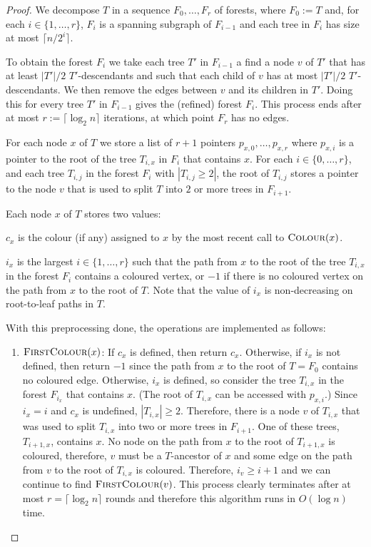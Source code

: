 \documentclass[kpfonts]{patmorin}
\let\ge\geqslant
\begin{document}
 \begin{proof}
     We decompose $T$ in a sequence $F_0,\ldots,F_r$ of forests, where $F_0:=T$ and, for each $i\in\{1,\ldots,r\}$, $F_i$ is a spanning subgraph of $F_{i-1}$ and each tree in $F_i$ has size at most $\lceil n/2^i\rceil$.

     To obtain the forest $F_i$ we take each tree $T'$ in $F_{i-1}$
     a find a node $v$ of $T'$ that has at least $|T'|/2$ $T'$-descendants and such that each child of $v$ has at most $|T'|/2$ $T'$-descendants.  We then remove the edges between $v$ and its children in $T'$.  Doing this for every tree $T'$ in $F_{i-1}$ gives the (refined) forest $F_i$.  This process ends after at most $r:=\lceil\log_2 n\rceil$ iterations, at which point $F_r$ has no edges.

     For each node $x$ of $T$ we store a list of $r+1$ pointers $p_{x,0},\ldots,p_{x,r}$ where $p_{x,i}$ is a pointer to the root of the tree $T_{i,x}$ in $F_i$ that contains $x$.  For each $i\in\{0,\ldots,r\}$, and each tree $T_{i,j}$ in the forest $F_i$ with $|T_{i,j}\ge 2|$, the root of $T_{i,j}$ stores a pointer to the node $v$ that is used to split $T$ into $2$ or more trees in $F_{i+1}$.

     Each node $x$ of $T$ stores two values:
     \begin{compactenum}
       \item $c_x$ is the colour (if any) assigned to $x$ by the most recent call to $\textsc{Colour}(x)$.
       \item $i_x$ is the largest $i\in\{1,\ldots,r\}$ such that the path from $x$ to the root of the tree $T_{i,x}$ in the forest $F_i$ contains a coloured vertex, or $-1$ if there is no coloured vertex on the path from $x$ to the root of $T$.  Note that the value of $i_x$ is non-decreasing on root-to-leaf paths in $T$.
     \end{compactenum}

     With this preprocessing done, the operations are implemented as follows:
     \begin{enumerate}
     \item $\textsc{FirstColour}(x)$:  If $c_x$ is defined, then return $c_x$.   Otherwise, if $i_x$ is not defined, then return $-1$ since the path from $x$ to the root of $T=F_0$ contains no coloured edge.  Otherwise, $i_x$ is defined, so consider the tree $T_{i,x}$ in the forest $F_{i_x}$ that contains $x$.  (The root of $T_{i,x}$ can be accessed with $p_{x,i}$.)  Since $i_x=i$ and $c_x$ is undefined, $|T_{i,x}|\ge 2$.  Therefore, there is a node $v$ of $T_{i,x}$ that was used to split $T_{i,x}$ into two or more trees in $F_{i+1}$.  One of these trees, $T_{i+1,x}$, contains $x$.  No node on the path from $x$ to the root of $T_{i+1,x}$ is coloured, therefore, $v$ must be a $T$-ancestor of $x$ and some edge on the path from $v$ to the root of $T_{i,x}$ is coloured.  Therefore, $i_v\ge i+1$ and we can continue to find $\textsc{FirstColour}(v)$.  This process clearly terminates after at most $r=\lceil\log_2 n\rceil$ rounds and therefore this algorithm runs in $O(\log n)$ time.


\end{enumerate}
\end{proof}
\end{document}
